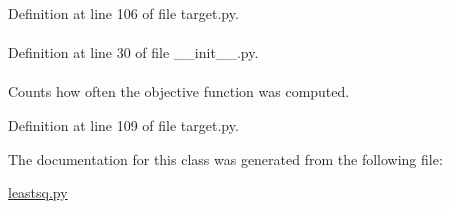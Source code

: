 \-Definition at line 106 of file target.\-py.

\hypertarget{classforcebalance_1_1BaseClass_afd68efa29ccd2f320f4cf82198214aac}{
\paragraph[{verbose\-\_\-options}]{}}\label{classforcebalance_1_1BaseClass_afd68efa29ccd2f320f4cf82198214aac}


\-Definition at line 30 of file \-\_\-\-\_\-init\-\_\-\-\_\-.\-py.

\hypertarget{classforcebalance_1_1target_1_1Target_ad4cd0ab38d8fc97d3e7a6e22ce130a16}{
\paragraph[{xct}]{}}\label{classforcebalance_1_1target_1_1Target_ad4cd0ab38d8fc97d3e7a6e22ce130a16}


\-Counts how often the objective function was computed. 



\-Definition at line 109 of file target.\-py.



\-The documentation for this class was generated from the following file\-:\begin{DoxyCompactItemize}
\item 
\hyperlink{leastsq_8py}{leastsq.\-py}\end{DoxyCompactItemize}
